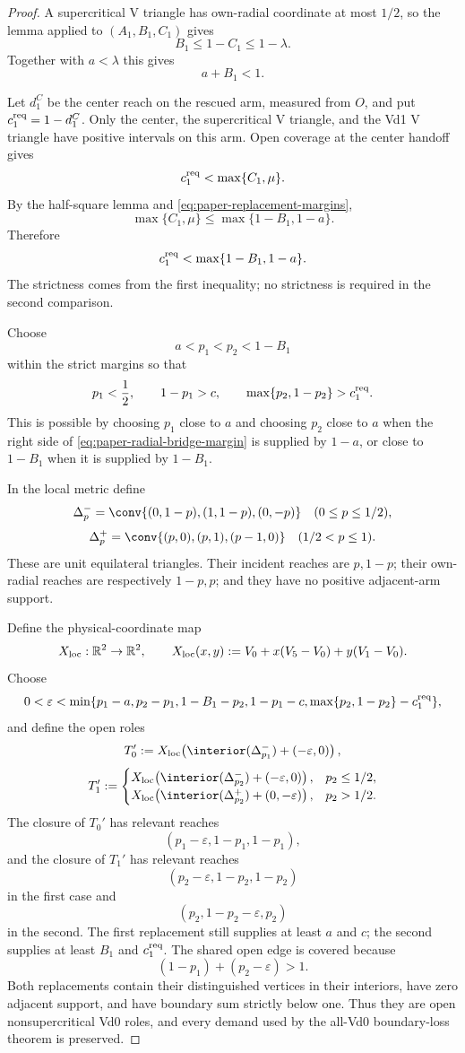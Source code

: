 \begin{proof}
A supercritical V triangle has own-radial coordinate at most $1/2$, so the lemma
applied to $(A_1,B_1,C_1)$ gives
\[
 B_1\le1-C_1\le1-\lambda.
\]
Together with $a<\lambda$ this gives
\begin{equation}
 a+B_1<1.
 \label{eq:paper-a-bi-margin}
\end{equation}

Let $d_1^C$ be the center reach on the rescued arm, measured from $O$, and put
$c_1^{\rm req}=1-d_1^C$.  Only the center, the supercritical V triangle, and the Vd1
V triangle have positive intervals on this arm.  Open coverage at the center handoff
gives
\[
 c_1^{\rm req}<\max\{C_1,\mu\}.
\]
By the half-square lemma and \eqref{eq:paper-replacement-margins},
\[
 \max\{C_1,\mu\}
 \le\max\{1-B_1,1-a\}.
\]
Therefore
\begin{equation}
 c_1^{\rm req}<\max\{1-B_1,1-a\}.
 \label{eq:paper-radial-bridge-margin}
\end{equation}
The strictness comes from the first inequality; no strictness is required in
the second comparison.

Choose
\[
 a<p_1<p_2<1-B_1
\]
within the strict margins so that
\[
 p_1<\frac12,
 \qquad
 1-p_1>c,
 \qquad
 \max\{p_2,1-p_2\}>c_1^{\rm req}.
\]
This is possible by choosing $p_1$ close to $a$ and choosing $p_2$ close to
$a$ when the right side of \eqref{eq:paper-radial-bridge-margin} is supplied by
$1-a$, or close to $1-B_1$ when it is supplied by $1-B_1$.

In the local metric define
\[
 \Delta_p^-=\conv\{(0,1-p),(1,1-p),(0,-p)\}
 \quad(0\le p\le1/2),
\]
\[
 \Delta_p^+=\conv\{(p,0),(p,1),(p-1,0)\}
 \quad(1/2<p\le1).
\]
These are unit equilateral triangles.  Their incident reaches are $p,1-p$;
their own-radial reaches are respectively $1-p,p$; and they have no positive
adjacent-arm support.

Define the physical-coordinate map
\[
 X_{\rm loc}:\mathbb R^2\to\mathbb R^2,\qquad
 X_{\rm loc}(x,y):=V_0+x(V_5-V_0)+y(V_1-V_0).
\]
Choose
\[
 0<\varepsilon<
 \min\{p_1-a, p_2-p_1, 1-B_1-p_2,
 1-p_1-c, \max\{p_2,1-p_2\}-c_1^{\rm req}\},
\]
and define the open roles
\[
 T_0':=
 X_{\rm loc}\!\left(\interior(\Delta_{p_1}^-)+(-\varepsilon,0)\right),
\]
\[
 T_1':=
 \begin{cases}
 X_{\rm loc}\!\left(\interior(\Delta_{p_2}^-)
 +(-\varepsilon,0)\right),&p_2\le1/2,\\
 X_{\rm loc}\!\left(\interior(\Delta_{p_2}^+)
 +(0,-\varepsilon)\right),&p_2>1/2.
 \end{cases}
\]
The closure of $T_0'$ has relevant reaches
\[
 (p_1-\varepsilon,1-p_1,1-p_1),
\]
and the closure of $T_1'$ has relevant reaches
\[
 (p_2-\varepsilon,1-p_2,1-p_2)
\]
in the first case and
\[
 (p_2,1-p_2-\varepsilon,p_2)
\]
in the second.  The first replacement still supplies at least $a$ and $c$;
the second supplies at least $B_1$ and $c_1^{\rm req}$.  The shared open edge
is covered because
\[
 (1-p_1)+(p_2-\varepsilon)>1.
\]
Both replacements contain their distinguished vertices in their interiors,
have zero adjacent support, and have boundary sum strictly below one.  Thus
they are open nonsupercritical Vd0 roles, and every demand used by the all-Vd0
boundary-loss theorem is preserved.
\end{proof}
